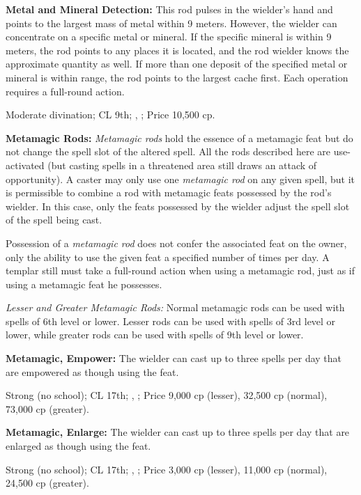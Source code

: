\textbf{Metal and Mineral Detection:} This rod pulses in the wielder's hand and points to the largest mass of metal within 9 meters. However, the wielder can concentrate on a specific metal or mineral. If the specific mineral is within 9 meters, the rod points to any places it is located, and the rod wielder knows the approximate quantity as well. If more than one deposit of the specified metal or mineral is within range, the rod points to the largest cache first. Each operation requires a full-round action.

Moderate divination; CL 9th; , ; Price 10,500 cp.

\textbf{Metamagic Rods:} \emph{Metamagic rods} hold the essence of a metamagic feat but do not change the spell slot of the altered spell. All the rods described here are use-activated (but casting spells in a threatened area still draws an attack of opportunity). A caster may only use one \emph{metamagic rod} on any given spell, but it is permissible to combine a rod with metamagic feats possessed by the rod's wielder. In this case, only the feats possessed by the wielder adjust the spell slot of the spell being cast.

Possession of a \emph{metamagic rod} does not confer the associated feat on the owner, only the ability to use the given feat a specified number of times per day. A templar still must take a full-round action when using a metamagic rod, just as if using a metamagic feat he possesses.

\textit{Lesser and Greater Metamagic Rods:} Normal metamagic rods can be used with spells of 6th level or lower. Lesser rods can be used with spells of 3rd level or lower, while greater rods can be used with spells of 9th level or lower.

\textbf{Metamagic, Empower:} The wielder can cast up to three spells per day that are empowered as though using the  feat.

Strong (no school); CL 17th; , ; Price 9,000 cp (lesser), 32,500 cp (normal), 73,000 cp (greater).

\textbf{Metamagic, Enlarge:} The wielder can cast up to three spells per day that are enlarged as though using the  feat.

Strong (no school); CL 17th; , ; Price 3,000 cp (lesser), 11,000 cp (normal), 24,500 cp (greater).

